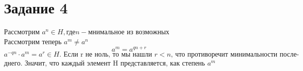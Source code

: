 \section*{Задание 4}
Рассмотрим $a^n\in H , \text{где} n - \text{мнимальное из возможных }$ \\
Рассмотрим теперь $a^m \ne a^n$
$$a^m = a^{qn+r}$$
$$a^{-qn}\cdot a^{m} = a^r \in H. \text{ Если r не ноль, то мы нашли $r<n$, что противоречит минимальности после-}$$  днего. Значит, что каждый элемент  H представляется, как степень $a^m$

